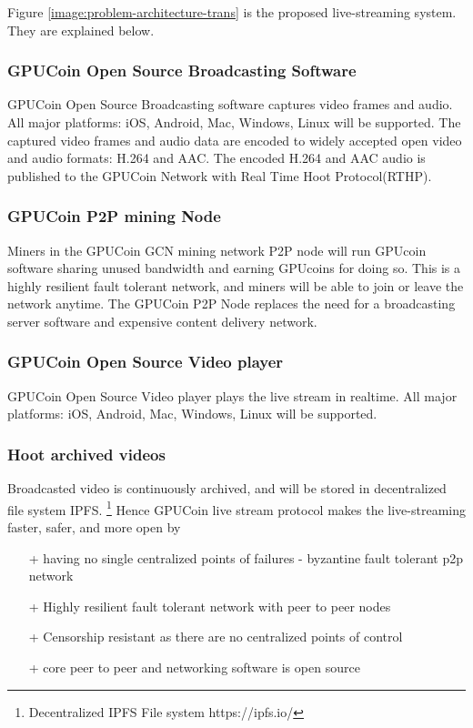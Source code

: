 \documentclass{article}
\begin{document}
Figure \ref{image:problem-architecture-trans} is the proposed live-streaming system. They are explained below.
\subsubsection{GPUCoin Open Source Broadcasting Software}
GPUCoin Open Source Broadcasting software captures video frames and audio. All major platforms: iOS, Android, Mac, Windows, Linux will be supported. The captured video frames and audio data are encoded to widely accepted open video and audio formats: H.264 and AAC. The encoded H.264 and AAC audio is published to the GPUCoin Network with Real Time Hoot Protocol(RTHP).

\subsubsection{GPUCoin P2P mining Node}
Miners in the GPUCoin GCN mining network P2P node will run GPUcoin software sharing unused bandwidth and earning GPUcoins for doing so. This is a highly resilient fault tolerant network, and miners will be able to join or leave the network anytime. The GPUCoin P2P Node replaces the need for a broadcasting server software and expensive content delivery network.

\subsubsection{GPUCoin Open Source Video player}
GPUCoin Open Source Video player plays the live stream in realtime. All major platforms: iOS, Android, Mac, Windows, Linux will be supported.

\subsubsection{Hoot archived videos}
Broadcasted video is continuously archived, and will be stored in decentralized file system IPFS. \footnote{Decentralized IPFS File system https://ipfs.io/} Hence GPUCoin live stream protocol makes the live-streaming faster, safer, and more open by
\begin{itemize}
 \item[+]having no single centralized points of failures - byzantine fault tolerant p2p network
 \item[+]Highly resilient fault tolerant network with peer to peer nodes
 \item[+]Censorship resistant as there are no centralized points of control
 \item[+]core peer to peer and networking software is open source
\end{itemize}
\end{document}
